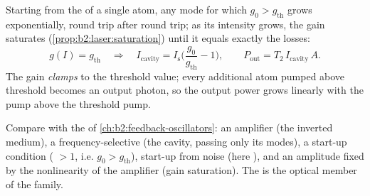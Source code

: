 \begin{proposition}\label{prop:b2:laser:steady}
Starting from the  of a single atom, any mode for
which $g_0 > g_{\text{th}}$ grows exponentially, round trip after round
trip; as its intensity grows, the gain saturates
(\cref{prop:b2:laser:saturation}) until it equals exactly the losses:
\[
g(I) = g_{\text{th}} \quad\Longrightarrow\quad
I_{\text{cavity}} = I_{\text{s}}\Big(\frac{g_0}{g_{\text{th}}} - 1\Big),
\qquad P_{\text{out}} = T_2\,I_{\text{cavity}}\,A .
\]
The gain \emph{clamps} to the threshold value; every additional atom
pumped above threshold becomes an output photon, so the output power
grows linearly with the pump above the threshold pump.
\end{proposition}

\begin{remark}\label{rem:b2:laser:feedback}
Compare with the  of
\cref{ch:b2:feedback-oscillators}: an amplifier (the inverted medium),
a frequency-selective  (the cavity, passing only its modes),
a start-up condition ( $> 1$, i.e. $g_0 > g_{\text{th}}$),
start-up from noise (here ), and an amplitude fixed
by the nonlinearity of the amplifier (gain saturation). The  is
the optical member of the family.
\end{remark}

